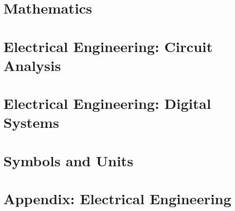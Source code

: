 \documentclass{article}
\newcommand{\LoadCheatsheet}[1]{{}}
\newcommand{\LoadAppendix}[1]{{}}
\begin{document}
\thispagestyle{plain}
\MakeCustomTitle
\bigskip


\begin{center}%
    \parbox{0.7\textwidth}{\doclicenseThis}%
\end{center}

{
    \hypersetup{linkcolor=black}
    \tableofcontents
}

\newpage
{}

\section{Mathematics}

\LoadCheatsheet{07-differential-equations}

\newpage
\section{Electrical Engineering: Circuit Analysis}
\label{sec:ee-circuit-analysis}

    \LoadCheatsheet{electrical-engineering-circuit-analysis/1-dc-analysis}
    \newpage
    \LoadCheatsheet{electrical-engineering-circuit-analysis/2a-intro}
    \newpage
    \LoadCheatsheet{electrical-engineering-circuit-analysis/2b-magnetically-coupled-circuits}
    \newpage
    \LoadCheatsheet{electrical-engineering-circuit-analysis/2c-power}
    \newpage
    \LoadCheatsheet{electrical-engineering-circuit-analysis/3a-op-amps}
    \newpage
    \LoadCheatsheet{electrical-engineering-circuit-analysis/3b-semiconductors}
    \newpage
    \LoadCheatsheet{electrical-engineering-circuit-analysis/3c-feedback}
    \newpage
    \LoadCheatsheet{electrical-engineering-circuit-analysis/4a-non-linear-circuits}
    \newpage
    \LoadCheatsheet{electrical-engineering-circuit-analysis/5a-common-configs-transistor-amplifiers}

\newpage
\section{Electrical Engineering: Digital Systems}
\label{sec:ee-digital}

    \LoadCheatsheet{electrical-engineering-digital-systems/1-basics}

\newpage
\section{Symbols and Units}
\label{sec:units}

    \LoadCheatsheet{symbols-and-units}

\newpage
{}

\newpage
\section{Appendix: Electrical Engineering}%
\label{sec:appendix-ee}

    \LoadAppendix{electrical-engineering/inductors-and-inductive-coupling}
    \newpage
    \LoadAppendix{electrical-engineering/amplifier-analysis}
\end{document}
